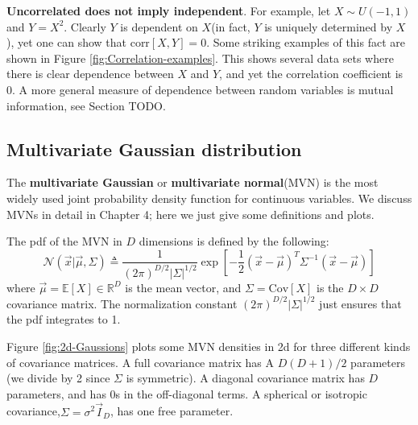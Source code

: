 \documentclass[graybox, envcountchap, twocolumn]{styles/svmult}
\begin{document}
\textbf{Uncorrelated does not imply independent}. For example, let $X \sim U(-1,1)$ and $Y =X^2$. Clearly $Y$ is dependent on $X$(in fact, $Y$ is uniquely determined by $X$), yet one can show that corr$[X, Y]=0$. Some striking examples of this fact are shown in Figure \ref{fig:Correlation-examples}. This shows several data sets where there is clear dependence between $X$ and $Y$, and yet the correlation coefficient is 0. A more general measure of dependence between random variables is mutual information, see Section TODO.


\subsection{Multivariate Gaussian distribution}
\label{sec:MVN}
The \textbf{multivariate Gaussian} or \textbf{multivariate normal}(MVN) is the most widely used joint probability density function for continuous variables. We discuss MVNs in detail in Chapter 4; here we just give some definitions and plots.

The pdf of the MVN in $D$ dimensions is defined by the following:
\begin{equation}
\mathcal{N}(\vec{x}|\vec{\mu},\Sigma) \triangleq \dfrac{1}{(2\pi)^{D/2}|\Sigma|^{1/2}}\exp\left[-\dfrac{1}{2}(\vec{x}-\vec{\mu})^T\Sigma^{-1}(\vec{x}-\vec{\mu})\right]
\end{equation}
where $\vec{\mu}=\mathbb{E}[X] \in \mathbb{R}^D$ is the mean vector, and $\Sigma=\text{Cov}[X]$ is the $D \times D$ covariance matrix. The normalization constant $(2\pi)^{D/2}|\Sigma|^{1/2}$ just ensures that the pdf integrates to 1.

Figure \ref{fig:2d-Gaussions} plots some MVN densities in 2d for three different kinds of covariance matrices. A full covariance matrix has A $D(D+1)/2$ parameters (we divide by 2 since $\Sigma$ is symmetric). A diagonal covariance matrix has $D$ parameters, and has 0s in the off-diagonal terms. A spherical or isotropic covariance,$\Sigma=\sigma^2\vec{I}_D$, has one free parameter.
\end{document}
